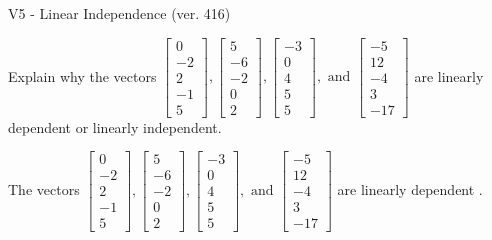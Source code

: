 \begin{exercise}
  \begin{exerciseTitle}V5 - Linear Independence (ver. 416)\end{exerciseTitle}
  \begin{exerciseStatement}
    Explain why the vectors \(\left[\begin{array}{r}
0 \\
-2 \\
2 \\
-1 \\
5
\end{array}\right] , \left[\begin{array}{r}
5 \\
-6 \\
-2 \\
0 \\
2
\end{array}\right] , \left[\begin{array}{r}
-3 \\
0 \\
4 \\
5 \\
5
\end{array}\right] , \text{ and } \left[\begin{array}{r}
-5 \\
12 \\
-4 \\
3 \\
-17
\end{array}\right]\) are linearly dependent or linearly independent.	


  \end{exerciseStatement}
  \begin{exerciseAnswer}
   The vectors \(\left[\begin{array}{r}
0 \\
-2 \\
2 \\
-1 \\
5
\end{array}\right] , \left[\begin{array}{r}
5 \\
-6 \\
-2 \\
0 \\
2
\end{array}\right] , \left[\begin{array}{r}
-3 \\
0 \\
4 \\
5 \\
5
\end{array}\right] , \text{ and } \left[\begin{array}{r}
-5 \\
12 \\
-4 \\
3 \\
-17
\end{array}\right]\) are 
  	 linearly dependent  .
  


  \end{exerciseAnswer}
\end{exercise}